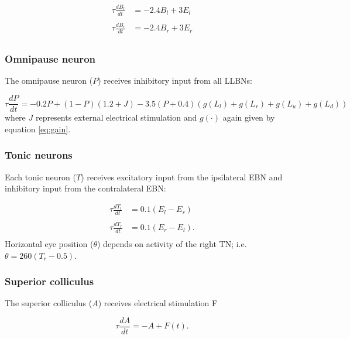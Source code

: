 \documentclass[10pt,a4paper,onecolumn]{article}
\begin{document}
\begin{equation}
\begin{array}{ll}
\tau\frac{dB_l}{dt} &= -2.4B_l+3E_l \\\\
\tau\frac{dB_r}{dt} &= -2.4B_r+3E_r \\
\end{array}
\label{eq:ibn}\end{equation}

\subsubsection{Omnipause neuron}\label{omnipause-neuron}

The omnipause neuron (\(P\)) receives inhibitory input from all LLBNs:

\begin{equation}
\tau\frac{dP}{dt} = -0.2P+(1-P)(1.2+J)-3.5(P+0.4)(g(L_l)+g(L_r)+g(L_u)+g(L_d))
\label{eq:opn}\end{equation} where \(J\) represents external electrical
stimulation and \(g(\cdot)\) again given by equation \ref{eq:gain}.

\subsubsection{Tonic neurons}\label{tonic-neurons}

Each tonic neuron (\(T\)) receives excitatory input from the ipsilateral
EBN and inhibitory input from the contralateral EBN:

\begin{equation}
\begin{array}{ll}
\tau\frac{dT_l}{dt} &= 0.1(E_l-E_r) \\\\
\tau\frac{dT_r}{dt} &= 0.1(E_r-E_l) \textrm{.} \\
\end{array}
\label{eq:tn}\end{equation} Horizontal eye position (\(\theta\)) depends
on activity of the right TN; i.e. \(\theta = 260(T_r-0.5)\).

\subsubsection{Superior colliculus}\label{superior-colliculus}

The superior colliculus (\(A\)) receives electrical stimulation F

\begin{equation}
\tau \frac{dA}{dt} =-A+F(t) \textrm{.}
\label{eq:sc}\end{equation}
\end{document}

